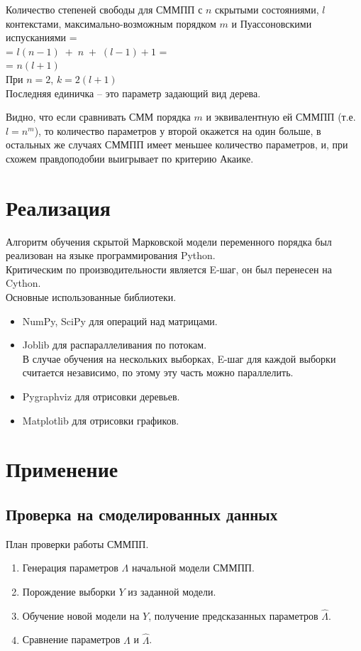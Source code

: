 \documentclass{matmex-diploma-custom}
\begin{document}
Количество степеней свободы для СММПП с $n$ скрытыми состояниями, $l$ контекстами, максимально-возможным порядком $m$ и Пуассоновскими испусканиями =
\\= $l(n-1)\;+\;n\;+\;(l-1) + 1$ = 
\\= $n(l+1)$
\\
При $n=2$, $k=2(l+1)$ 
\\
Последняя единичка -- это параметр задающий вид дерева.

Видно, что если сравнивать СММ порядка $m$ и эквивалентную ей СММПП (т.е. $l = n^{m}$), то количество параметров у второй окажется на один больше, в остальных же случаях СММПП имеет меньшее количество параметров, и, при схожем правдоподобии выигрывает по критерию Акаике.


\section{Реализация}
Алгоритм обучения скрытой Марковской модели переменного порядка был реализован на языке программирования Python. 
\\
Критическим по производительности является E-шаг, он был перенесен на Cython.
\\
Основные использованные библиотеки.
\begin{itemize}
\item
NumPy, SciPy для операций над матрицами.
\item
Joblib для распараллеливания по потокам.
\\
В случае обучения на нескольких выборках, E-шаг для каждой выборки считается независимо, по этому эту часть можно параллелить.
\item
Pygraphviz для отрисовки деревьев. 
\item
Matplotlib для отрисовки графиков.
\end{itemize}

\section{Применение}
\subsection{Проверка на смоделированных данных}
План проверки работы СММПП.
\begin{enumerate}

\item
Генерация параметров $ \Lambda $ начальной модели СММПП.
\item
Порождение выборки $ Y $ из заданной модели.
\item
Обучение новой модели на $ Y $, получение предсказанных параметров $\hat{\Lambda}$.
\item
Сравнение параметров $ \Lambda $ и $ \hat{\Lambda} $.
\end{enumerate}
\end{document}
